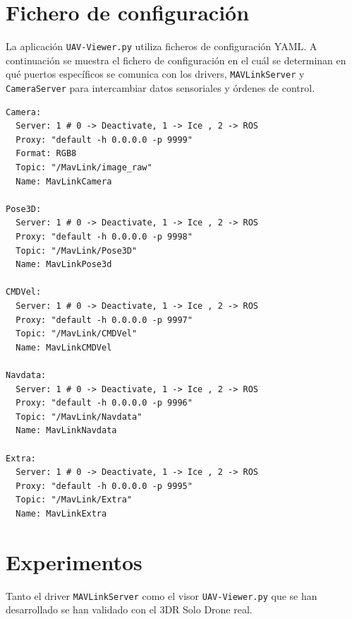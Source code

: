 \section{Fichero de configuración}

La aplicación \texttt{UAV-Viewer.py} utiliza ficheros de configuración YAML. A continuación se muestra el fichero de configuración en el cuál se determinan en qué puertos específicos se comunica con los drivers, \texttt{MAVLinkServer} y \texttt{CameraServer} para intercambiar datos sensoriales y órdenes de control.

\begin{lstlisting}[frame=single]
Camera:
  Server: 1 # 0 -> Deactivate, 1 -> Ice , 2 -> ROS
  Proxy: "default -h 0.0.0.0 -p 9999"
  Format: RGB8
  Topic: "/MavLink/image_raw"
  Name: MavLinkCamera

Pose3D:
  Server: 1 # 0 -> Deactivate, 1 -> Ice , 2 -> ROS
  Proxy: "default -h 0.0.0.0 -p 9998"
  Topic: "/MavLink/Pose3D"
  Name: MavLinkPose3d

CMDVel:
  Server: 1 # 0 -> Deactivate, 1 -> Ice , 2 -> ROS
  Proxy: "default -h 0.0.0.0 -p 9997"
  Topic: "/MavLink/CMDVel"
  Name: MavLinkCMDVel

Navdata:
  Server: 1 # 0 -> Deactivate, 1 -> Ice , 2 -> ROS
  Proxy: "default -h 0.0.0.0 -p 9996"
  Topic: "/MavLink/Navdata"
  Name: MavLinkNavdata

Extra:
  Server: 1 # 0 -> Deactivate, 1 -> Ice , 2 -> ROS
  Proxy: "default -h 0.0.0.0 -p 9995"
  Topic: "/MavLink/Extra"
  Name: MavLinkExtra
\end{lstlisting}

\section{Experimentos}

Tanto el driver \texttt{MAVLinkServer} como el visor \texttt{UAV-Viewer.py} que se han desarrollado se han validado con el 3DR Solo Drone real.

